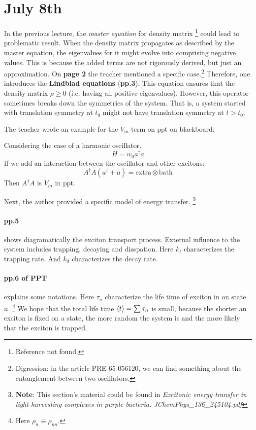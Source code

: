 \documentclass{article}
\numberwithin{equation}{subsection} %
\theoremstyle{definition}
\begin{document}
\section{July 8th}
\label{sec:July_8th}
In the previous lecture, the \textit{master equation} for density matrix
\footnote{Reference not found.}
could lead to problematic result. When the density matrix propagates
as described by the master equation, the eigenvalues for it might
evolve into comprising negative values. This is because the added terms
are not rigorously derived, but just an approximation. On \textbf{page 2} the
teacher mentioned a specific case.\footnote{
    Digression: in the article PRE 65 056120, we can find
    something about the entanglement between two oscillators.
}
Therefore, one introduces the \textbf{Lindblad equations}
(\textbf{pp.3}). This equation ensures that the 
density matrix $\rho \geq 0$ (i.e. having all positive
eigenvalues). However, this operator sometimes breaks down
the symmetries of the system. That is, a system started with
translation symmetry at $t_0$ might not have translation
symmetry at $t > t_0$.

The teacher wrote an example for the $V_m$ term on ppt on blackboard:

Considering the case of a harmonic oscillator.
$$ H = w_0 a^\dagger a $$
If we add an interaction between the oscillator and other excitons:
$$ A^\dagger A (a^\dagger + a) = \text{extra} \otimes \text{bath}$$
Then $A^\dagger A$ is $V_m$ in ppt.

Next, the author provided a specific model of energy transfer.
\footnote{
\textbf{Note}: This section's material could be found in
\textit{Excitonic energy transfer in light-harvesting complexes 
in purple bacteria. JChemPhys\_136\_245104.pdf}
}

\paragraph{pp.5} shows diagramatically the exciton transport process.
External influence to the system includes trapping, decaying and disspation.
Here $k_t$ characterizes the trapping rate. And $k_d$ characterizes
the decay rate.

\paragraph{pp.6 of PPT} explains some notations.
Here $\tau_n$ characterize the life time 
of exciton in on state $n$. \footnote{ Here
$\rho_n \equiv \rho_{nn}$.} We hope that the total life time
$\braket{t} = \sum \tau_n$
is small, because the shorter an exciton is fixed on a state,
the more random the system is and the more likely that the exciton
is trapped.
\end{document}
